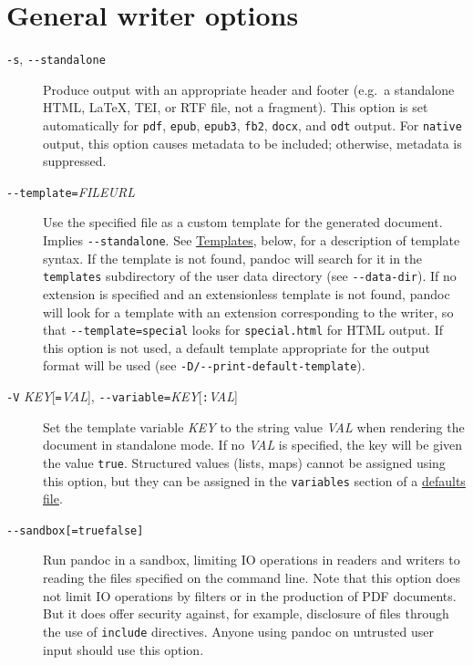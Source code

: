 \documentclass[
  b5paper
]{book}
\begin{document}
\section{General writer options}\label{general-writer-options}

\begin{description}
\item[\texttt{-s}, \texttt{-\/-standalone}]
Produce output with an appropriate header and footer (e.g.~a standalone
HTML, LaTeX, TEI, or RTF file, not a fragment). This option is set
automatically for \texttt{pdf}, \texttt{epub}, \texttt{epub3},
\texttt{fb2}, \texttt{docx}, and \texttt{odt} output. For
\texttt{native} output, this option causes metadata to be included;
otherwise, metadata is suppressed.
\item[\texttt{-\/-template=}\emph{FILE}\textbar{}\emph{URL}]
Use the specified file as a custom template for the generated document.
Implies \texttt{-\/-standalone}. See \hyperref[templates]{Templates},
below, for a description of template syntax. If the template is not
found, pandoc will search for it in the \texttt{templates} subdirectory
of the user data directory (see \texttt{-\/-data-dir}). If no extension
is specified and an extensionless template is not found, pandoc will
look for a template with an extension corresponding to the writer, so
that \texttt{-\/-template=special} looks for \texttt{special.html} for
HTML output. If this option is not used, a default template appropriate
for the output format will be used (see
\texttt{-D/-\/-print-default-template}).
\item[\texttt{-V} \emph{KEY}{[}\texttt{=}\emph{VAL}{]},
\texttt{-\/-variable=}\emph{KEY}{[}\texttt{:}\emph{VAL}{]}]
Set the template variable \emph{KEY} to the string value \emph{VAL} when
rendering the document in standalone mode. If no \emph{VAL} is
specified, the key will be given the value \texttt{true}. Structured
values (lists, maps) cannot be assigned using this option, but they can
be assigned in the \texttt{variables} section of a
\hyperref[defaults-files]{defaults file}.
\item[\texttt{-\/-sandbox{[}=true\textbar{}false{]}}]
Run pandoc in a sandbox, limiting IO operations in readers and writers
to reading the files specified on the command line. Note that this
option does not limit IO operations by filters or in the production of
PDF documents. But it does offer security against, for example,
disclosure of files through the use of \texttt{include} directives.
Anyone using pandoc on untrusted user input should use this option.


\end{description}
\end{document}
